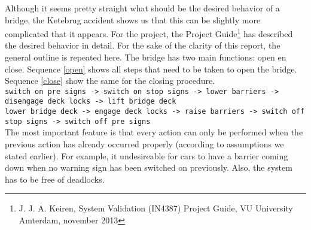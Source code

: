 Although it seems pretty straight what should be the desired behavior of a bridge, the Ketebrug accident shows us that this can be slightly more complicated that it appears. For the project, the Project Guide\footnote{J. J. A. Keiren, System Validation (IN4387) Project Guide, VU University Amterdam, november 2013} has described the desired behavior in detail. For the sake of the clarity of this report, the general outline is repeated here. The bridge has two main functions: open en close. Sequence \ref{open} shows all steps that need to be taken to open the bridge. Sequence \ref{close} show the same for the closing procedure.\\
%
\begingroup
\footnotesize
\vspace{+10pt}
\texttt{switch on pre signs -> switch on stop signs -> lower barriers -> disengage deck locks -> lift bridge deck}\\
\label{open}
\endgroup
%
\begingroup
\footnotesize
\vspace{+10pt}
\texttt{lower bridge deck -> engage deck locks -> raise barriers -> switch off stop signs -> switch off pre signs}\\
\vspace{+10pt}
\label{close}
\endgroup
%
The most important feature is that every action can only be performed when the previous action has already occurred properly (according to assumptions we stated earlier). For example, it undesireable for cars to have a barrier coming down when no warning sign has been switched on previously. Also, the system has to be free of deadlocks. 